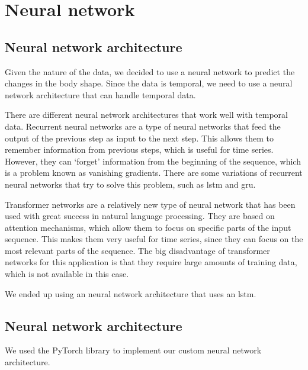\chapter{Neural network}\label{chap:nn}

\section{Neural network architecture}

Given the nature of the data, we decided to use a neural network to predict the
changes in the body shape. Since the data is temporal, we need to use a neural
network architecture that can handle temporal data.

There are different neural network architectures that work well with temporal
data. Recurrent neural networks are a type of neural networks that feed the
output of the previous step as input to the next step. This allows them to
remember information from previous steps, which is useful for time series.
However, they can `forget' information from the beginning of the sequence,
which is a problem known as vanishing gradients. There are some variations of
recurrent neural networks that try to solve this problem, such as \gls{lstm}
and \gls{gru}.

Transformer networks are a relatively new type of neural network that has been
used with great success in natural language processing. They are based on
attention mechanisms, which allow them to focus on specific parts of the input
sequence. This makes them very useful for time series, since they can focus on
the most relevant parts of the sequence. The big disadvantage of transformer
networks for this application is that they require large amounts of training
data, which is not available in this case.

We ended up using an neural network architecture that uses an \gls{lstm}.

\section{Neural network architecture}

We used the PyTorch library to implement our custom neural network
architecture.

